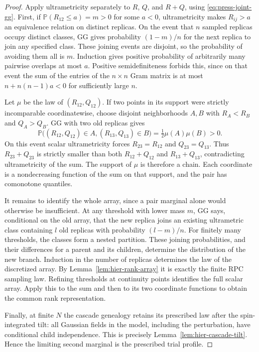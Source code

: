 \documentclass[11pt,a4paper]{article}
\numberwithin{equation}{section}
\theoremstyle{definition}
\theoremstyle{remark}
\newcommand{\Prob}{\mathbb P}
\begin{document}
\begin{proof}
Apply ultrametricity separately to $R$, $Q$, and $R+Q$, using
\eqref{eq:press-joint-gg}. First, if $\Prob(R_{12}\le a)=m>0$ for some $a<0$,
ultrametricity makes $R_{ij}>a$ an equivalence relation on distinct replicas.
On the event that $n$ sampled replicas occupy distinct classes, GG gives
probability $(1-m)/n$ for the next replica to join any specified class.
These joining events are disjoint, so the probability of avoiding them all
is $m$. Induction gives positive probability of arbitrarily many pairwise
overlaps at most $a$. Positive semidefiniteness forbids this, since on that
event the sum of the entries of the $n\times n$ Gram matrix is at most
$n+n(n-1)a<0$ for sufficiently large $n$.

Let $\mu$ be the law of $(R_{12},Q_{12})$. If two points in its support were
strictly incomparable coordinatewise, choose disjoint neighborhoods $A,B$
with $R_A<R_B$ and $Q_A>Q_B$. GG with two old replicas gives
\[
 \Prob\big((R_{12},Q_{12})\in A, (R_{13},Q_{13})\in B\big)
 =\tfrac12\mu(A)\mu(B)>0.
\]
On this event scalar ultrametricity forces $R_{23}=R_{12}$ and
$Q_{23}=Q_{13}$. Thus $R_{23}+Q_{23}$ is strictly smaller than both
$R_{12}+Q_{12}$ and $R_{13}+Q_{13}$, contradicting ultrametricity of the sum.
The support of $\mu$ is therefore a chain. Each coordinate is a nondecreasing
function of the sum on that support, and the pair has comonotone quantiles.

It remains to identify the whole array, since a pair marginal alone would
otherwise be insufficient. At any threshold with lower mass $m$, GG says,
conditional on the old array, that the new replica joins an existing
ultrametric class containing $l$ old replicas with probability $(l-m)/n$.
For finitely many thresholds, the classes form a nested partition. These
joining probabilities, and their differences for a parent and its children,
determine the distribution of the new branch. Induction in the number of
replicas determines the law of the discretized array. By
Lemma~\ref{lem:hier-rank-array} it is exactly the finite RPC sampling law.
Refining thresholds at continuity points identifies the full scalar array.
Apply this to the sum and then to its two coordinate functions to obtain the
common rank representation.

Finally, at finite $N$ the cascade genealogy retains its prescribed law after
the spin-integrated tilt: all Gaussian fields in the model, including the
perturbation, have conditional child independence. This is precisely
Lemma~\ref{lem:hier-cascade-tilt}. Hence the limiting second marginal is the
prescribed trial profile.
\end{proof}
\end{document}
